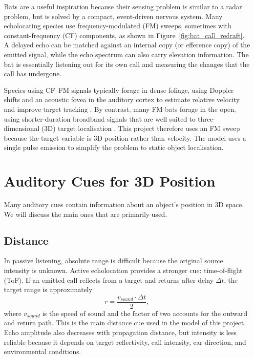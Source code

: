 Bats are a useful inspiration because their sensing problem is similar to a radar problem, but is solved by a compact, event-driven nervous system. Many echolocating species use frequency-modulated (FM) sweeps, sometimes with constant-frequency (CF) components, as shown in Figure~\ref{fig:bat_call_redraft}. A delayed echo can be matched against an internal copy (or efference copy) of the emitted signal, while the echo spectrum can also carry elevation information. The bat is essentially listening out for its own call and measuring the changes that the call has undergone. 



Species using CF--FM signals typically forage in dense foliage, using Doppler shifts and an acoustic fovea in the auditory cortex to estimate relative velocity and improve target tracking \cite{MossANeurobiologyBats,Ulanovsky2008WhatBrain}. By contrast, many FM bats forage in the open, using shorter-duration broadband signals that are well suited to three-dimensional (3D) target localisation \cite{MossANeurobiologyBats}. This project therefore uses an FM sweep because the target variable is 3D position rather than velocity. The model uses a single pulse emission to simplify the problem to static object localisation.

\section{Auditory Cues for 3D Position}

Many auditory cues contain information about an object's position in 3D space. We will discuss the main ones that are primarily used.

\subsection{Distance}

In passive listening, absolute range is difficult because the original source intensity is unknown. Active echolocation provides a stronger cue: time-of-flight (ToF). If an emitted call reflects from a target and returns after delay $\Delta t$, the target range is approximately
\begin{equation}
    r = \frac{v_{sound} \cdot \Delta t}{2},
    \label{eq:tof_distance_redraft}
\end{equation}
where $v_{sound}$ is the speed of sound and the factor of two accounts for the outward and return path. This is the main distance cue used in the model of this project. Echo amplitude also decreases with propagation distance, but intensity is less reliable because it depends on target reflectivity, call intensity, ear direction, and environmental conditions.

